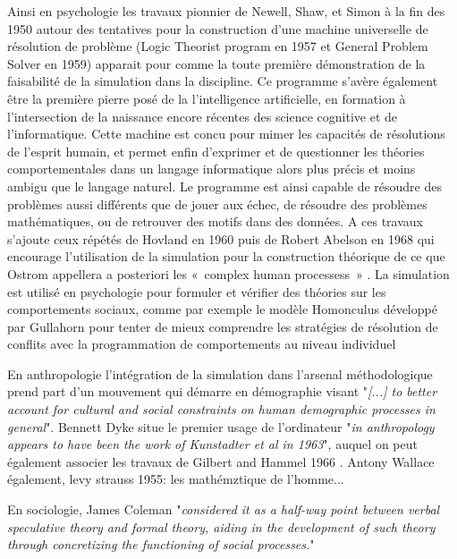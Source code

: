 Ainsi en psychologie les travaux pionnier de Newell, Shaw, et Simon à la fin des 1950 autour des tentatives pour la construction d'une machine universelle de résolution de problème (Logic Theorist program en 1957 et General Problem Solver en 1959) apparait pour \autocite{Gullahorn1965}  comme la toute première démonstration de la faisabilité de la simulation dans la discipline. Ce programme s'avère également être la première pierre posé de la l'intelligence artificielle, en formation à l'intersection de la naissance encore récentes des science cognitive et de l'informatique. Cette machine est concu pour mimer les capacités de résolutions de l'esprit humain, et permet enfin d'exprimer et de questionner les théories comportementales dans un langage informatique alors plus précis et moins ambigu que le langage naturel. Le programme est ainsi capable de résoudre des problèmes aussi différents que de jouer aux échec, de résoudre des problèmes mathématiques,  ou de retrouver des motifs dans des données. A ces travaux s'ajoute ceux répétés de Hovland en 1960 puis de Robert Abelson en 1968  qui encourage l'utilisation de la simulation pour la construction théorique de ce que Ostrom appellera a posteriori les « complex human processess » \autocite{Ostrom1988}. La simulation est utilisé en psychologie pour formuler et vérifier des théories sur les comportements sociaux\autocite{Gullahorn1965a}, comme par exemple le modèle Homonculus développé par Gullahorn pour tenter de mieux comprendre les stratégies de résolution de conflits avec la programmation de comportements au niveau individuel \autocite{Gullahorn1965} 

En anthropologie l'intégration de la simulation dans l'arsenal méthodologique prend part d'un mouvement qui démarre en démographie visant "\textit{[...] to better account for cultural and social constraints on human demographic processes in general}". Bennett Dyke situe le premier usage de l'ordinateur "\textit{in anthropology appears to have been the work of Kunstadter et al in 1963}", auquel on peut également associer les travaux de Gilbert and Hammel 1966 \autocite{Costopoulos2007} \autocite{Dyke1981}. Antony Wallace également, levy strauss 1955: les mathémztique de l'homme...
 
En sociologie, James Coleman "\textit{considered it as a half-way point between verbal speculative theory and formal theory, aiding in the development of such theory through concretizing the functioning of social processes.}" \autocite[36]{Schultz1972}

